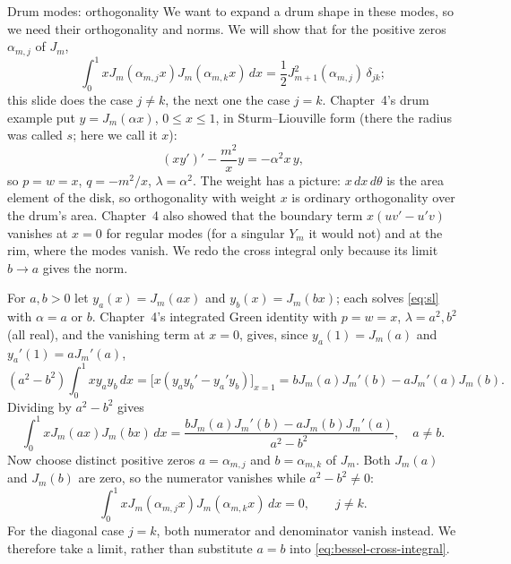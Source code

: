 \documentclass[11pt]{beamer}
\begin{document}
\begin{frame}[allowframebreaks=1.00]{Drum modes: orthogonality}
\footnotesize
We want to expand a drum shape in these modes, so we need their orthogonality and norms.
We will show that for the positive zeros $\alpha_{m,j}$ of $J_m$,
\[
 \int_0^1xJ_m(\alpha_{m,j}x)J_m(\alpha_{m,k}x)\,dx=\frac12J_{m+1}^2(\alpha_{m,j})\,\delta_{jk};
\]
this slide does the case $j\ne k$, the next one the case $j=k$.
Chapter~4's drum example put $y=J_m(\alpha x)$, $0\le x\le1$, in Sturm--Liouville form (there the
radius was called $s$; here we call it $x$):
\begin{equation}
 (xy')'-\frac{m^2}{x}y=-\alpha^2x\,y,
 \label{eq:sl}
\end{equation}
so $p=w=x$, $q=-m^2/x$, $\lambda=\alpha^2$. The weight has a picture: $x\,dx\,d\theta$ is the
area element of the disk, so orthogonality with weight $x$ is ordinary orthogonality over the
drum's area. Chapter~4 also showed that the boundary term $x(uv'-u'v)$ vanishes at $x=0$ for
regular modes (for a singular $Y_m$ it would not) and at the rim, where
the modes vanish. We redo the cross integral only because its limit $b\to a$ gives the norm.

For $a,b>0$ let $y_a(x)=J_m(ax)$ and $y_b(x)=J_m(bx)$; each solves \eqref{eq:sl} with
$\alpha=a$ or $b$. Chapter~4's integrated Green identity with $p=w=x$, $\lambda=a^2,b^2$ (all
real), and the vanishing term at $x=0$, gives, since $y_a(1)=J_m(a)$ and $y_a'(1)=aJ_m'(a)$,
\[
 (a^2-b^2)\int_0^1xy_ay_b\,dx=\bigl[x(y_ay_b'-y_a'y_b)\bigr]_{x=1}
 =bJ_m(a)J_m'(b)-aJ_m'(a)J_m(b).
\]
Dividing by $a^2-b^2$ gives
\begin{equation}
 \int_0^1xJ_m(ax)J_m(bx)\,dx
 =\frac{bJ_m(a)J_m'(b)-aJ_m(b)J_m'(a)}{a^2-b^2},\quad a\ne b.
 \label{eq:bessel-cross-integral}
\end{equation}
Now choose distinct positive zeros $a=\alpha_{m,j}$ and $b=\alpha_{m,k}$ of $J_m$.
Both $J_m(a)$ and $J_m(b)$ are zero, so the numerator vanishes while $a^2-b^2\ne0$:
\begin{equation}
 \int_0^1xJ_m(\alpha_{m,j}x)J_m(\alpha_{m,k}x)\,dx=0,
 \qquad j\ne k.
 \label{eq:bessel-orth-offdiag}
\end{equation}
For the diagonal case $j=k$, both numerator and denominator vanish instead.
We therefore take a limit, rather than substitute $a=b$ into \eqref{eq:bessel-cross-integral}.
\end{frame}
\end{document}
